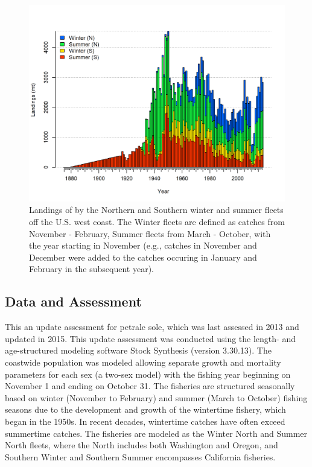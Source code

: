 \documentclass[12pt,]{article}
\begin{document}
\FloatBarrier

\begin{figure}
\centering
\includegraphics{r4ss/plots_mod1/catch2 landings stacked.png}
\caption{Landings of by the Northern and Southern winter and summer
fleets off the U.S. west coast. The Winter fleets are defined as catches
from November - February, Summer fleets from March - October, with the
year starting in November (e.g., catches in November and December were
added to the catches occuring in January and February in the subsequent
year). \label{fig:Exec_catch1}}
\end{figure}

\FloatBarrier

\subsection*{Data and Assessment}\label{data-and-assessment}

This an update assessment for petrale sole, which was last assessed in
2013 and updated in 2015. This update assessment was conducted using the
length- and age-structured modeling software Stock Synthesis (version
3.30.13). The coastwide population was modeled allowing separate growth
and mortality parameters for each sex (a two-sex model) with the fishing
year beginning on November 1 and ending on October 31. The fisheries are
structured seasonally based on winter (November to February) and summer
(March to October) fishing seasons due to the development and growth of
the wintertime fishery, which began in the 1950s. In recent decades,
wintertime catches have often exceed summertime catches. The fisheries
are modeled as the Winter North and Summer North fleets, where the North
includes both Washington and Oregon, and Southern Winter and Southern
Summer encompasses California fisheries.
\end{document}
